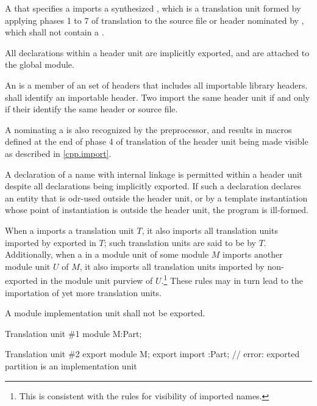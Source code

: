 \pnum
A  that specifies
a   imports
a synthesized ,
which is a translation unit formed by applying
phases 1 to 7 of translation
to the source file or header nominated by ,
which shall not contain a .
\begin{note}
All declarations within a header unit are implicitly
exported,
and are attached to the global module.
\end{note}
An  is a member of an
set of headers that
includes all importable \Cpp{} library headers.
 shall identify an importable header.
Two
import the same header unit if and only if
their  identify the same
header or source file.
\begin{note}
A  nominating
a  is also recognized by the
preprocessor, and results in macros defined at the
end of phase 4 of translation of the header unit
being made visible as described in \ref{cpp.import}.
\end{note}
A declaration of a name with internal linkage is
permitted within a header unit despite all
declarations being implicitly exported.
If such a declaration declares an entity
that is odr-used outside the
header unit, or by a template
instantiation whose point of instantiation is outside
the header unit, the program is ill-formed.

\pnum
When a  imports
a translation unit $T$, it also imports
all translation units imported by
exported 
in $T$; such translation units are
said to be  by $T$.
Additionally, when a 
in a module unit of some module $M$ imports another module unit $U$ of $M$,
it also imports all translation units imported by
non-exported 
in the module unit purview of $U$.\footnote{This is consistent
with the rules for visibility of imported names.}
These rules may in turn lead to the importation of yet more
translation units.

\pnum
A module implementation unit shall not be exported.
\begin{example}
\begin{codeblocktu}{Translation unit \#1}
module M:Part;
\end{codeblocktu}

\begin{codeblocktu}{Translation unit \#2}
export module M;
export import :Part;    // error: exported partition  is an implementation unit
\end{codeblocktu}
\end{example}

